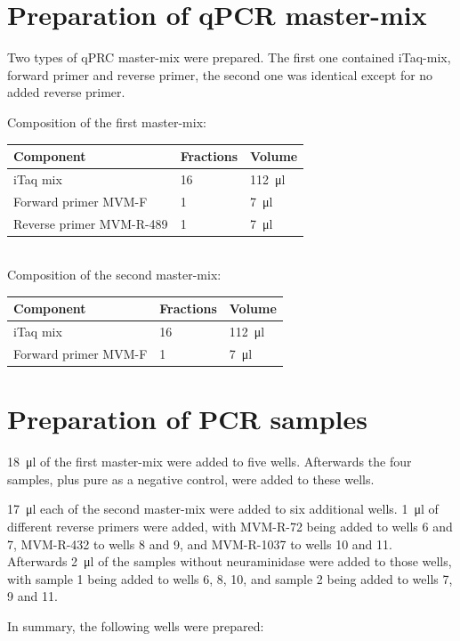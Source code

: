 \documentclass[a4paper,english]{scrreprt}
\begin{document}
\section{Preparation of qPCR master-mix}

Two types of qPRC master-mix were prepared. The first one contained iTaq-mix,
forward primer and reverse primer, the second one was identical except for no
added reverse primer.

Composition of the first master-mix:
\\

\begin{tabu}{lll}
	\toprule
	Component & Fractions & Volume \\
	\midrule
	iTaq mix & 16 & \SI{112}{\ul} \\
	Forward primer MVM-F & 1 & \SI{7}{\ul} \\
	Reverse primer MVM-R-489 & 1 & \SI{7}{\ul} \\
	\bottomrule
\end{tabu}
\\

Composition of the second master-mix:
\\

\begin{tabu}{lll}
	\toprule
	Component & Fractions & Volume \\
	\midrule
	iTaq mix & 16 & \SI{112}{\ul} \\
	Forward primer MVM-F & 1 & \SI{7}{\ul} \\
	\bottomrule
\end{tabu}

\section{Preparation of PCR samples}

\SI{18}{\ul} of the first master-mix were added to five wells. Afterwards the
four samples, plus pure  as a negative control, were added to these
wells.

\SI{17}{\ul} each of the second master-mix were added to six additional wells.
\SI{1}{\ul} of different reverse primers were added, with MVM-R-72 being added
to wells 6 and 7, MVM-R-432 to wells 8 and 9, and MVM-R-1037 to wells 10 and
11. Afterwards \SI{2}{\ul} of the samples without neuraminidase were added to
those wells, with sample 1 being added to wells 6, 8, 10, and sample 2 being
added to wells 7, 9 and 11.

In summary, the following wells were prepared:
\\
\end{document}
